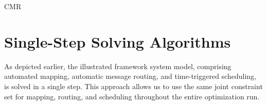 \begin{algorithm}[]
{{                
                
            }
        }
    \caption{CMR}
    \label{cmr}
    \end{algorithm}

    \section{Single-Step Solving Algorithms}

    As depicted earlier, the illustrated framework system model, comprising automated mapping, automatic message routing, and time-triggered scheduling, is solved in a single step. This approach allows us to use the same joint constraint set for mapping, routing, and scheduling throughout the entire optimization run. %
    


